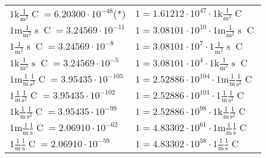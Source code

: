 \begin{center}
\begin{longtable}{l l}
{\color{gray}$1 \bm{\mathrm{ k}}\frac1{\operatorname{m}^2}{}{\operatorname{C}}{} = 6.20300\cdot10^{-48} $}\quad(*) & {\color{gray}$ 1 = 1.61212\cdot10^{47} \cdot 1 \bm{\mathrm{ k}}\frac1{\operatorname{m}^2}{}{\operatorname{C}}{}$}  \\
{\color{gray}$1 \bm{\mathrm{ m}}\frac1{\operatorname{m}^2}{\operatorname{s}}{\operatorname{C}}{} = 3.24569\cdot10^{-11} $}   & {\color{gray}$ 1 = 3.08101\cdot10^{10} \cdot 1 \bm{\mathrm{ m}}\frac1{\operatorname{m}^2}{\operatorname{s}}{\operatorname{C}}{}$}  \\
{\color{black}$1 \bm{\mathrm{ }}\frac1{\operatorname{m}^2}{\operatorname{s}}{\operatorname{C}}{} = 3.24569\cdot10^{-8} $}   & {\color{black}$ 1 = 3.08101\cdot10^{7} \cdot 1 \bm{\mathrm{ }}\frac1{\operatorname{m}^2}{\operatorname{s}}{\operatorname{C}}{}$}  \\
{\color{gray}$1 \bm{\mathrm{ k}}\frac1{\operatorname{m}^2}{\operatorname{s}}{\operatorname{C}}{} = 3.24569\cdot10^{-5} $}   & {\color{gray}$ 1 = 3.08101\cdot10^{4} \cdot 1 \bm{\mathrm{ k}}\frac1{\operatorname{m}^2}{\operatorname{s}}{\operatorname{C}}{}$}  \\
{\color{gray}$1 \bm{\mathrm{ m}}\frac1{\operatorname{m}}\frac1{\operatorname{s}^2}{\operatorname{C}}{} = 3.95435\cdot10^{-105} $}   & {\color{gray}$ 1 = 2.52886\cdot10^{104} \cdot 1 \bm{\mathrm{ m}}\frac1{\operatorname{m}}\frac1{\operatorname{s}^2}{\operatorname{C}}{}$}  \\
{\color{black}$1 \bm{\mathrm{ }}\frac1{\operatorname{m}}\frac1{\operatorname{s}^2}{\operatorname{C}}{} = 3.95435\cdot10^{-102} $}   & {\color{black}$ 1 = 2.52886\cdot10^{101} \cdot 1 \bm{\mathrm{ }}\frac1{\operatorname{m}}\frac1{\operatorname{s}^2}{\operatorname{C}}{}$}  \\
{\color{gray}$1 \bm{\mathrm{ k}}\frac1{\operatorname{m}}\frac1{\operatorname{s}^2}{\operatorname{C}}{} = 3.95435\cdot10^{-99} $}   & {\color{gray}$ 1 = 2.52886\cdot10^{98} \cdot 1 \bm{\mathrm{ k}}\frac1{\operatorname{m}}\frac1{\operatorname{s}^2}{\operatorname{C}}{}$}  \\
{\color{gray}$1 \bm{\mathrm{ m}}\frac1{\operatorname{m}}\frac1{\operatorname{s}}{\operatorname{C}}{} = 2.06910\cdot10^{-62} $}   & {\color{gray}$ 1 = 4.83302\cdot10^{61} \cdot 1 \bm{\mathrm{ m}}\frac1{\operatorname{m}}\frac1{\operatorname{s}}{\operatorname{C}}{}$}  \\
{\color{black}$1 \bm{\mathrm{ }}\frac1{\operatorname{m}}\frac1{\operatorname{s}}{\operatorname{C}}{} = 2.06910\cdot10^{-59} $}   & {\color{black}$ 1 = 4.83302\cdot10^{58} \cdot 1 \bm{\mathrm{ }}\frac1{\operatorname{m}}\frac1{\operatorname{s}}{\operatorname{C}}{}$}  \\

\end{longtable}
\end{center}
